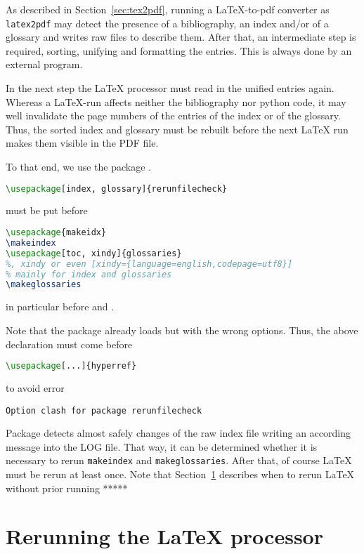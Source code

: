 As described in Section~\ref{sec:tex2pdf}, 
running a \LaTeX-to-pdf converter as \texttt{latex2pdf} 
may detect the presence of a bibliography, an index and/or of a glossary 
and writes raw files to describe them. 
After that, an intermediate step is required, 
sorting, unifying and formatting the entries. 
This is always done by an external program. 

In the next step the \LaTeX{} processor must read in the unified entries again. 
Whereas a \LaTeX-run affects neither the bibliography nor python code, 
it may well invalidate the page numbers 
of the entries of the index or of the glossary. 
Thus, the sorted index and glossary must be rebuilt 
before the next \LaTeX{} run makes them visible in the PDF file. 

To that end, we use the package . 
%
\begin{lstlisting}[language=TeX]
\usepackage[index, glossary]{rerunfilecheck}
\end{lstlisting}
%
must be put before 
%
\begin{lstlisting}[language=TeX]
\usepackage{makeidx}
\makeindex
\usepackage[toc, xindy]{glossaries}
%, xindy or even [xindy={language=english,codepage=utf8}]
% mainly for index and glossaries 
\makeglossaries
\end{lstlisting}
%
in particular before  and . 

Note that the package  already loads  
but with the wrong options. 
Thus, the above declaration must come before 
%
\begin{lstlisting}[language=TeX]
\usepackage[...]{hyperref}
\end{lstlisting}
%
to avoid error 
%
\begin{verbatim}
Option clash for package rerunfilecheck
\end{verbatim}

Package  detects almost safely 
changes of the raw index file writing an according message 
into the LOG file. 
That way, it can be determined whether it is necessary 
to rerun \texttt{makeindex} and \texttt{makeglossaries}. 
After that, of course \LaTeX{} must be rerun at least once. 
Note that Section~\ref{sec:rerunLatex} describes 
when to rerun \LaTeX{} without prior running *****

\section{Rerunning the \LaTeX{} processor}\label{sec:rerunLatex}

